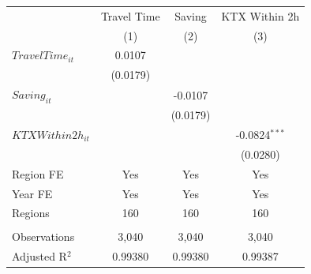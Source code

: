 \begingroup
\centering
\begin{tabular}{lccc}
   \toprule
                      & Travel Time & Saving   & KTX Within 2h \\   
                      & (1)         & (2)      & (3)\\  
   \midrule 
   $TravelTime_{it}$  & 0.0107      &          &   \\   
                      & (0.0179)    &          &   \\   
   $Saving_{it}$      &             & -0.0107  &   \\   
                      &             & (0.0179) &   \\   
   $KTXWithin2h_{it}$ &             &          & -0.0824$^{***}$\\   
                      &             &          & (0.0280)\\   
   Region FE          & Yes         & Yes      & Yes\\  
   Year FE            & Yes         & Yes      & Yes\\  
   Regions            & 160         & 160      & 160\\  
    \\
   Observations       & 3,040       & 3,040    & 3,040\\  
   Adjusted R$^2$     & 0.99380     & 0.99380  & 0.99387\\  
   \bottomrule
\end{tabular}
\par\endgroup
